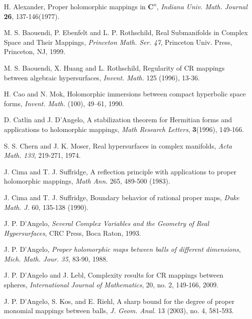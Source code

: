 \documentclass[12pt]{article}
\numberwithin{equation}{section}
\begin{document}
\begin{thebibliography}{99999}


 H. Alexander, { Proper holomorphic mappings in
${\mathbf C}^n$}, {\it Indiana Univ. Math. Journal} {\bf 26}, 137-146(1977).


 M. S. Baouendi, P. Ebenfelt and L. P.
Rothschild, { Real Submanifolds in Complex Space and Their
Mappings}, {\it Princeton Math. Ser. 47}, Princeton Univ. Press,
Princeton, NJ, 1999.


 M. S. Baouendi, X. Huang and L. Rothschild, Regularity of CR
mappings between algebraic hypersurfaces,
 {\it Invent. Math.} 125 (1996), 13-36.

 H. Cao and N. Mok,
 Holomorphic immersions between compact hyperbolic space forms, {\it Invent. Math.} (100),
49--61, 1990.

 D. Catlin and J. D'Angelo, A stabilization
theorem for Hermitian forms and applications to holomorphic
mappings, {\it Math Research Letters}, \textbf{3}(1996), 149-166.

S. S. Chern and J. K. Moser, { Real hypersurfaces in complex
manifolds}, {\it Acta Math. 133}, 219-271, 1974.


 J. Cima and T. J. Suffridge, A reflection principle with
applications to proper holomorphic mappings, {\it Math Ann.} 265,
489-500 (1983).


 J. Cima and T. J. Suffridge, Boundary behavior of rational
proper maps, {\it Duke Math. J.} 60, 135-138 (1990).

 J. P. D'Angelo, {\it Several Complex Variables and
the Geometry of Real Hypersurfaces}, CRC Press, Boca Raton, 1993.

 J. P. D'Angelo, {\it Proper
holomorphic maps between balls of different dimensions},
{\it Mich. Math. Jour. 35}, 83-90, 1988.

 J. P. D'Angelo and J. Lebl,   Complexity results
for CR mappings between spheres, {\it International Journal of
Mathematics}, 20, no. 2, 149-166, 2009.

 J. P. D'Angelo, S. Kos, and E. Riehl, A sharp bound for
the degree of proper monomial mappings between balls, {\it J. Geom.
Anal.} 13 (2003), no. 4, 581-593.





\end{thebibliography}
\end{document}
